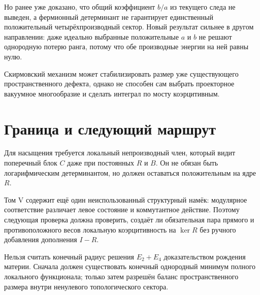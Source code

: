 Но ранее уже доказано, что общий коэффициент $b/a$ из текущего следа не
выведен, а фермионный детерминант не гарантирует единственный положительный
четырёхпроизводный сектор. Новый результат сильнее в другом направлении:
даже идеально выбранные положительные $a$ и $b$ не решают однородную
потерю ранга, потому что обе производные энергии на ней равны нулю.

\begin{proposition}
Скирмовский механизм может стабилизировать размер уже существующего
пространственного дефекта, однако не способен сам выбрать проекторное
вакуумное многообразие и сделать интеграл по мосту коэрцитивным.
\end{proposition}

\section{Граница и следующий маршрут}

Для насыщения требуется локальный непроизводный член, который видит
поперечный блок $C$ даже при постоянных $R$ и $B$. Он не обязан быть
логарифмическим детерминантом, но должен оставаться положительным на
ядре $R$.

Том V содержит ещё один неиспользованный структурный намёк: модулярное
соответствие различает левое состояние и коммутантное действие. Поэтому
следующая проверка должна проверить, создаёт ли обязательная пара прямого и
противоположного весов локальную коэрцитивность на
$\ker R$ без ручного добавления дополнения $I-R$.

\begin{nogocriterion}
Нельзя считать конечный радиус решения $E_2+E_4$ доказательством рождения
материи. Сначала должен существовать конечный однородный минимум полного
локального функционала; только затем разрешён баланс пространственного
размера внутри ненулевого топологического сектора.
\end{nogocriterion}

